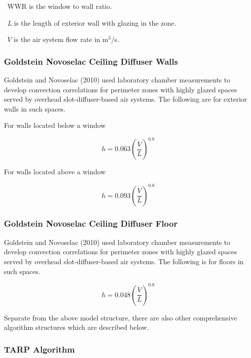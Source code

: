 ~WWR is the window to wall ratio.

~\emph{L} is the length of exterior wall with glazing in the zone.

~\(\dot V\) is the air system flow rate in m\(^{3}\)/s.

\subsubsection{Goldstein Novoselac Ceiling Diffuser Walls}\label{goldstein-novoselac-ceiling-diffuser-walls}

Goldstein and Novoselac (2010) used laboratory chamber measurements to develop convection correlations for perimeter zones with highly glazed spaces served by overhead slot-diffuser-based air systems. The following are for exterior walls in such spaces.

For walls located below a window

\begin{equation}
h = 0.063{\left( {\frac{{\dot V}}{L}} \right)^{0.8}}
\end{equation}

For walls located above a window

\begin{equation}
h = 0.093{\left( {\frac{{\dot V}}{L}} \right)^{0.8}}
\end{equation}

\subsubsection{Goldstein Novoselac Ceiling Diffuser Floor}\label{goldstein-novoselac-ceiling-diffuser-floor}

Goldstein and Novoselac (2010) used laboratory chamber measurements to develop convection correlations for perimeter zones with highly glazed spaces served by overhead slot-diffuser-based air systems. The following is for floors in such spaces.

\begin{equation}
h = 0.048{\left( {\frac{{\dot V}}{L}} \right)^{0.8}}
\end{equation}

Separate from the above model structure, there are also other comprehensive algorithm structures which are described below.

\subsubsection{TARP Algorithm}\label{tarp-algorithm}

